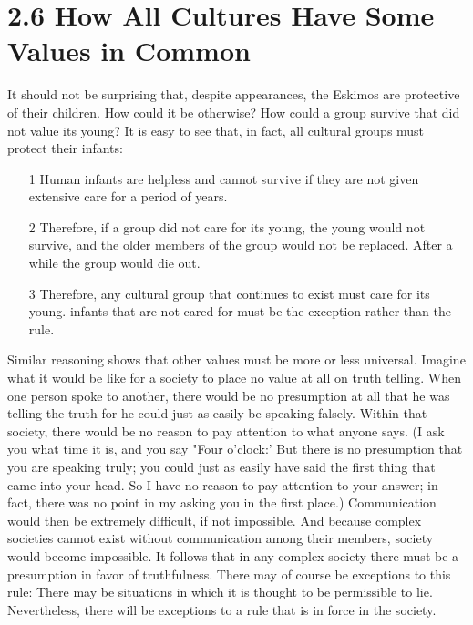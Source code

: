\section{2.6 How All Cultures Have Some Values in Common} 
It  should  not  be  surprising  that,  despite  appearances,  the  Eskimos  are 
protective  of  their  children.  How  could  it  be  otherwise?  How  could  a 
group survive that did not value its young? It is easy to see that, in fact, 
all cultural groups must protect their infants: 
\begin{enumerate}
\item[1] Human  infants  are  helpless  and  cannot  survive  if  they are 
not given extensive care for a period of years. 
\item[2] Therefore,  if  a  group  did  not  care  for  its  young,  the  young 
would  not  survive,  and  the  older  members  of  the  group 
would  not  be  replaced.  After  a  while  the  group  would  die 
out. 
\item[3] Therefore,  any  cultural  group  that  continues  to  exist  must 
care for its young. infants that are not cared for must be the 
exception rather than the rule. 
\end{enumerate}
Similar reasoning shows that other values must be more or less 
universal. Imagine what it would be like for a society to place no value at 
all on truth telling. When one person spoke to another, there would be no 
presumption at all that he was telling the truth for he could just as easily 
be speaking falsely. Within that society, there would be no reason to pay 
attention  to  what  anyone  says.  (I  ask  you  what  time  it  is,  and  you  say 
"Four  o'clock:'  But  there  is  no  presumption  that  you  are  speaking  truly; 
you  could  just  as  easily  have  said  the  first  thing  that  came  into  your 
head. So I have no reason to pay attention to your answer; in fact, there 
was no point  in my asking you in the first place.) Communication would 
then  be  extremely  difficult,  if  not  impossible.  And  because  complex 
societies  cannot  exist  without  communication  among  their  members, 
society would become impossible. It follows that in any complex society 
there  must  be  a  presumption  in  favor  of  truthfulness.  There  may  of 
course be exceptions to  this rule: There may be  situations in which it is 
thought to be permissible to lie. Nevertheless, there will be exceptions to 
a rule that is in force in the society.
 
